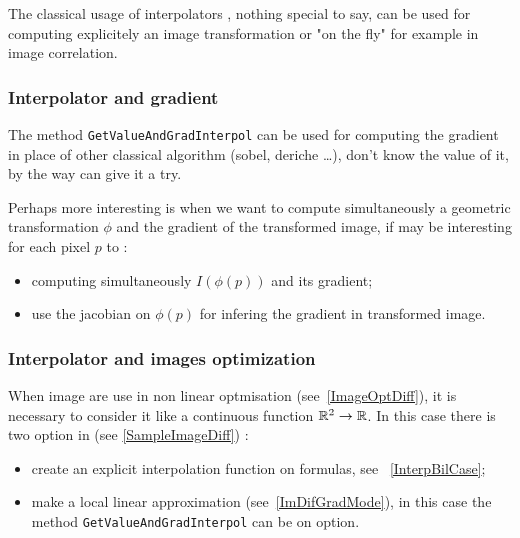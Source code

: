 The classical usage of interpolators , nothing special to say, can be used for computing explicitely 
an image transformation or "on the fly" for example in image correlation.


\subsubsection{Interpolator and gradient}

The method {\tt GetValueAndGradInterpol} can be used for computing the gradient in place
of other classical algorithm (sobel, deriche \dots), don't know the value of it, by the way
can give it a try.

Perhaps more interesting is when we want to compute simultaneously a geometric transformation $\phi$
and the gradient of the transformed image, if may be interesting for each pixel $p$ to :

\begin{itemize}
   \item computing simultaneously $I(\phi(p))$ and its gradient;
   \item use the jacobian on $\phi(p)$ for infering the gradient in transformed image.
\end{itemize}


\subsubsection{Interpolator and images optimization}

When image are use in non linear optmisation (see~\ref{ImageOptDiff}), it is necessary to consider it like a
continuous function $\mathbb{R}^2 \rightarrow \mathbb{R}$. In this case there is two option in
\PPP (see \ref{SampleImageDiff}) :

\begin{itemize}
     \item  create an explicit interpolation function on formulas, see ~\ref{InterpBilCase};
     \item  make a local linear approximation (see~\ref{ImDifGradMode}), in this case the
            method {\tt GetValueAndGradInterpol} can be on option.
\end{itemize}

